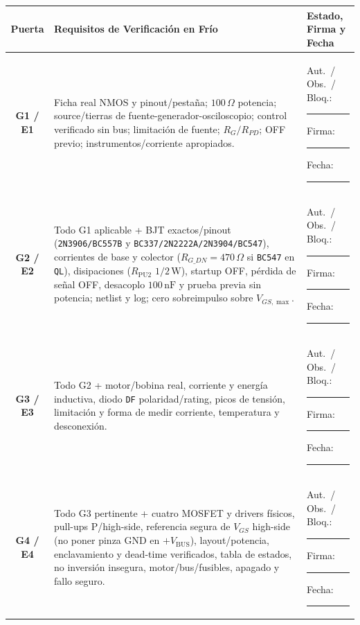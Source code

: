 \documentclass[10pt, a4paper, landscape]{article}
\begin{document}
\par\vspace{0.1cm}\noindent
\renewcommand{\arraystretch}{1.38}
{\small
\begin{tabularx}{\linewidth}{|c|>{\raggedright\arraybackslash}X|>{\raggedright\arraybackslash}p{4.8cm}|}
\hline
\rowcolor{ucbgray}
\textbf{Puerta} & \textbf{Requisitos de Verificación en Frío} & \textbf{Estado, Firma y Fecha} \\ \hline
\textbf{G1 / E1} & Ficha real NMOS y pinout/pestaña; $100\,\Omega$ potencia; source/tierras de fuente-generador-osciloscopio; control verificado sin bus; limitación de fuente; $R_G/R_{PD}$; OFF previo; instrumentos/corriente apropiados. & Aut.\ / Obs.\ / Bloq.: \rule{1.5cm}{0.4pt}\newline Firma: \rule{2.7cm}{0.4pt}\newline Fecha: \rule{2.7cm}{0.4pt} \\ \hline
\textbf{G2 / E2} & Todo G1 aplicable + BJT exactos/pinout (\texttt{2N3906/BC557B} y \texttt{BC337/2N2222A/2N3904/BC547}), corrientes de base y colector ($R_{G\_DN}=470\,\Omega$ si \texttt{BC547} en \texttt{QL}), disipaciones ($R_{\text{PU2}}$ $1/2\,\text{W}$), startup OFF, pérdida de señal OFF, desacoplo $100\,\text{nF}$ y prueba previa sin potencia; netlist y log; cero sobreimpulso sobre $V_{GS,\max}$. & Aut.\ / Obs.\ / Bloq.: \rule{1.5cm}{0.4pt}\newline Firma: \rule{2.7cm}{0.4pt}\newline Fecha: \rule{2.7cm}{0.4pt} \\ \hline
\textbf{G3 / E3} & Todo G2 + motor/bobina real, corriente y energía inductiva, diodo \texttt{DF} polaridad/rating, picos de tensión, limitación y forma de medir corriente, temperatura y desconexión. & Aut.\ / Obs.\ / Bloq.: \rule{1.5cm}{0.4pt}\newline Firma: \rule{2.7cm}{0.4pt}\newline Fecha: \rule{2.7cm}{0.4pt} \\ \hline
\textbf{G4 / E4} & Todo G3 pertinente + cuatro MOSFET y drivers físicos, pull-ups P/high-side, referencia segura de $V_{GS}$ high-side (no poner pinza GND en $+V_{\text{BUS}}$), layout/potencia, enclavamiento y dead-time verificados, tabla de estados, no inversión insegura, motor/bus/fusibles, apagado y fallo seguro. & Aut.\ / Obs.\ / Bloq.: \rule{1.5cm}{0.4pt}\newline Firma: \rule{2.7cm}{0.4pt}\newline Fecha: \rule{2.7cm}{0.4pt} \\ \hline
\end{tabularx}
}
\end{document}
